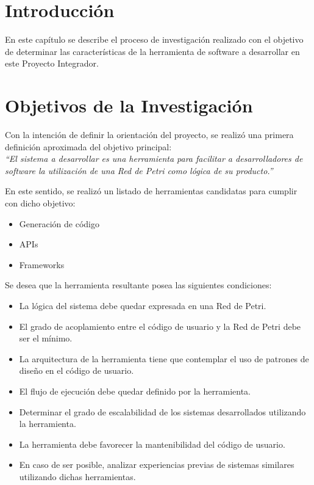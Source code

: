 \section{Introducción}
En este capítulo se describe el proceso de investigación realizado con el
objetivo de determinar las características de la herramienta de software a
desarrollar en este Proyecto Integrador.

\section{Objetivos de la Investigación}
Con la intención de definir la orientación del proyecto, se realizó
una primera definición aproximada del objetivo principal:\\
\emph{``El sistema a desarrollar es una herramienta para facilitar a
desarrolladores de software la utilización de una Red de Petri como lógica de su
producto.''}

En este sentido, se realizó un listado de herramientas candidatas para
cumplir con dicho objetivo:
\begin{itemize}
  \item Generación de código
  \item APIs
  \item Frameworks
\end{itemize}

Se desea que la herramienta resultante posea las siguientes condiciones:
\begin{itemize}
    \item La lógica del sistema debe quedar expresada en una Red de Petri.
    \item El grado de acoplamiento entre el código de usuario
    y la Red de Petri debe ser el mínimo.
    \item La arquitectura de la herramienta tiene que contemplar el uso de
    patrones de diseño en el código de usuario.
    \item El flujo de ejecución debe quedar definido por la herramienta.
    \item Determinar el grado de escalabilidad de los sistemas desarrollados
    utilizando la herramienta.
    \item La herramienta debe favorecer la mantenibilidad del código de usuario.
    \item En caso de ser posible, analizar experiencias previas de sistemas
    similares utilizando dichas herramientas.
\end{itemize}

